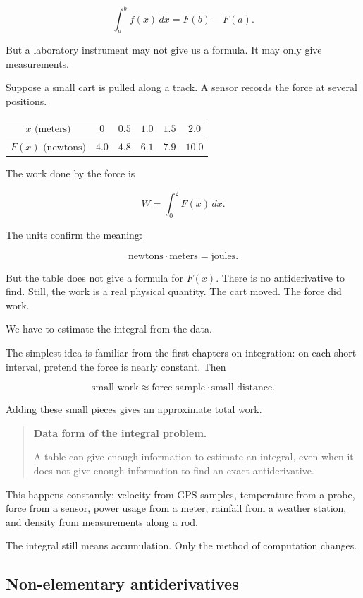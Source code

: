 \[
\int_a^b f(x)\,dx=F(b)-F(a).
\]

But a laboratory instrument may not give us a formula.  It may only give measurements.

Suppose a small cart is pulled along a track.  A sensor records the force at several
positions.

\begin{center}
\begin{tabular}{c|ccccc}
\(x\text{ (meters)}\) & \(0\) & \(0.5\) & \(1.0\) & \(1.5\) & \(2.0\) \\ \hline
\(F(x)\text{ (newtons)}\) & \(4.0\) & \(4.8\) & \(6.1\) & \(7.9\) & \(10.0\)
\end{tabular}
\end{center}

The work done by the force is

\[
W=\int_0^2 F(x)\,dx.
\]

The units confirm the meaning:

\[
\text{newtons}\cdot\text{meters}=\text{joules}.
\]

But the table does not give a formula for \(F(x)\).  There is no antiderivative to find.
Still, the work is a real physical quantity.  The cart moved.  The force did work.

We have to estimate the integral from the data.

The simplest idea is familiar from the first chapters on integration: on each short
interval, pretend the force is nearly constant.  Then

\[
\text{small work}\approx \text{force sample}\cdot \text{small distance}.
\]

Adding these small pieces gives an approximate total work.

\begin{quote}
\textbf{Data form of the integral problem.}

A table can give enough information to estimate an integral, even when it does not give
enough information to find an exact antiderivative.
\end{quote}

This happens constantly: velocity from GPS samples, temperature from a probe, force
from a sensor, power usage from a meter, rainfall from a weather station, and density
from measurements along a rod.

The integral still means accumulation.  Only the method of computation changes.

\subsection{Non-elementary antiderivatives}
\label{subsec:non-elementary-antiderivatives}

